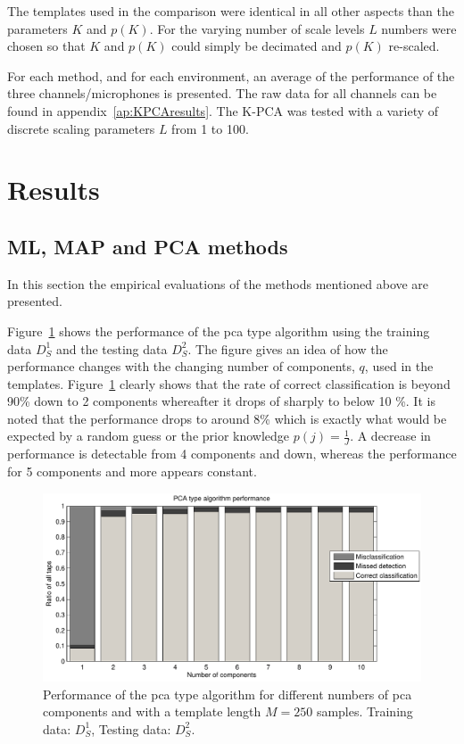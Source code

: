 The templates used in the comparison were identical in all other aspects than the parameters $K$ and $p(K)$. For the varying number of scale levels $L$ numbers were chosen so that $K$ and $p(K)$ could simply be decimated and $p(K)$ re-scaled.

For each method, and for each environment, an average of the performance of the three channels/microphones is presented. The raw data for all channels can be found in appendix~\ref{ap:KPCAresults}. The K-PCA was tested with a variety of discrete scaling parameters $L$ from 1 to 100.

\section{Results}\label{sec:results}
\subsection{ML, MAP and PCA methods}
In this section the empirical evaluations of the methods mentioned above are presented.

Figure~\ref{fig:PCAperform} shows the performance of the \gls{pca} type algorithm using the training data $D^1_S$ and the testing data $D^2_S$. The figure gives an idea of how the performance changes with the changing number of components, $q$, used in the templates. Figure~\ref{fig:PCAperform} clearly shows that the rate of correct classification is beyond 90\% down to 2 components whereafter it drops of sharply to below 10 \%. It is noted that the performance drops to around 8\% which is exactly what would be expected by a random guess or the prior knowledge $p(j)= \frac{1}{J}$. A decrease in performance is detectable from 4 components and down, whereas the performance for 5 components and more appears constant.

\begin{figure}[!] %
\centering
\includegraphics[width=150mm]{PCAperform.pdf}
\caption{Performance of the \gls{pca} type algorithm for different numbers of \gls{pca} components and with a template length $M=250$ samples. Training data: $D^1_S$, Testing data: $D^2_S$.}\label{fig:PCAperform}
\end{figure}

